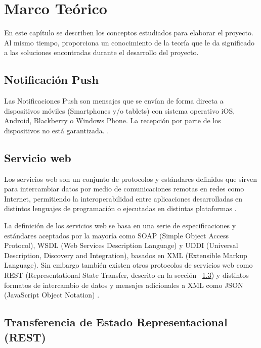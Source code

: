 \chapter{Marco Teórico} \label{chap:Marco Teorico}

\vspace{5 mm}

En este capítulo se describen los conceptos estudiados para elaborar el proyecto. Al mismo tiempo, proporciona un conocimiento de la teoría que le da significado a las soluciones encontradas durante el desarrollo del proyecto.

\section{Notificación Push} \label{sect:Notificacion Push}

Las Notificaciones Push son mensajes que se envían de forma directa a dispositivos móviles (Smartphones y/o tablets) con sistema operativo iOS, Android, Blackberry o Windows Phone. La recepción por parte de los dispositivos no está garantizada. \cite{MTPUSH}.  

\section{Servicio web} \label{sect:Servicio web}

Los servicios web son un conjunto de protocolos y estándares definidos que sirven para intercambiar datos por medio de comunicaciones remotas en redes como Internet, permitiendo la interoperabilidad entre aplicaciones desarrolladas en distintos lenguajes de programación o ejecutadas en distintas plataformas \cite{MTREST}. 

La definición de los servicios web se basa en una serie de especificaciones y estándares aceptados por la mayoría como SOAP (Simple Object Access Protocol), WSDL (Web Services Description Language) y UDDI (Universal Description, Discovery and Integration), basados en XML (Extensible Markup Language). Sin embargo también existen otros protocolos de servicios web como REST (Representational State Transfer, descrito en la sección ~\ref{sect:Transferencia de estado representacional (REST)}) y distintos formatos de intercambio de datos y mensajes adicionales a XML como JSON (JavaScript Object Notation) \cite{MTREST}.

\section{Transferencia de Estado Representacional (REST)} \label{sect:Transferencia de estado representacional (REST)}

